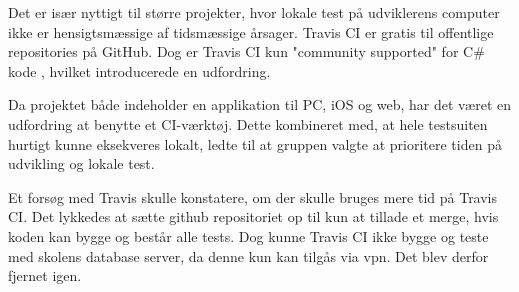 Det er især nyttigt til større projekter, hvor lokale test på udviklerens computer ikke er hensigtsmæssige af tidsmæssige årsager. Travis CI er gratis til offentlige repositories på GitHub. Dog er Travis CI kun "community supported" for C\# kode \cite{communitysupportedlanguages2016}, hvilket introducerede en udfordring.

Da projektet både indeholder en applikation til PC, iOS og web, har det været en udfordring at benytte et CI-værktøj. Dette kombineret med, at hele testsuiten hurtigt kunne eksekveres lokalt, ledte til at gruppen valgte at prioritere tiden på udvikling og lokale test.

Et forsøg med Travis skulle konstatere, om der skulle bruges mere tid på Travis CI. Det lykkedes at sætte github repositoriet op til kun at tillade et merge, hvis koden kan bygge og består alle tests. Dog kunne Travis CI ikke bygge og teste med skolens database server, da denne kun kan tilgås via vpn. Det blev derfor fjernet igen.

